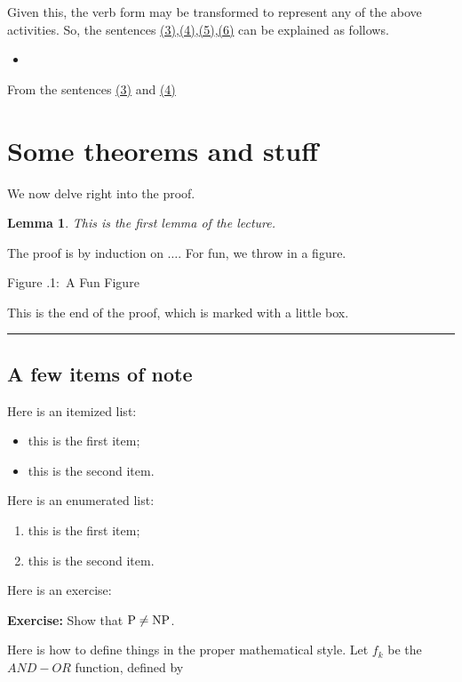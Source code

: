 \documentclass[twoside]{article}
\newcounter{lecnum}
\newcommand{\fig}[3]{
			\vspace{#2}
			\begin{center}
			Figure \thelecnum.#1:~#3
			\end{center}
	}
\newtheorem{lemma}[theorem]{Lemma}
\newenvironment{proof}{{\bf Proof:}}{\hfill\rule{2mm}{2mm}}
\begin{document}
Given this, the verb form may be transformed to represent any of the above activities. So, the sentences \hyperlink{fig3}{(3)},\hyperlink{fig4}{(4)},\hyperlink{fig5}{(5)},\hyperlink{fig6}{(6)} can be explained as follows.

\begin{itemize}
 \item 
\end{itemize}

From the sentences \hyperlink{fig3}{(3)} and \hyperlink{fig4}{(4)}


\section{Some theorems and stuff} %

We now delve right into the proof.

\begin{lemma}
This is the first lemma of the lecture.
\end{lemma}

\begin{proof}
The proof is by induction on $\ldots$.
For fun, we throw in a figure.
\fig{1}{1in}{A Fun Figure}

This is the end of the proof, which is marked with a little box.
\end{proof}

\subsection{A few items of note}

Here is an itemized list:
\begin{itemize}
\item this is the first item;
\item this is the second item.
\end{itemize}

Here is an enumerated list:
\begin{enumerate}
\item this is the first item;
\item this is the second item.
\end{enumerate}

Here is an exercise:

{\bf Exercise:}  Show that ${\rm P}\ne{\rm NP}$.

Here is how to define things in the proper mathematical style.
Let $f_k$ be the $AND-OR$ function, defined by
\end{document}
